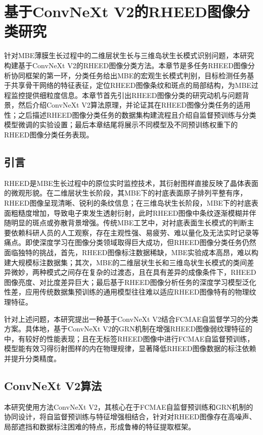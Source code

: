 \clearpage

\section{基于ConvNeXt V2的RHEED图像分类研究}

针对MBE薄膜生长过程中的二维层状生长与三维岛状生长模式识别问题，本研究构建基于ConvNeXt V2的RHEED图像分类方法。本章节是多任务RHEED图像分析协同框架的第一环，分类任务给出MBE的宏观生长模式判别，目标检测任务基于共享骨干网络的特征表征，定位RHEED图像条纹和斑点的局部结构，为MBE过程监控提供细粒度信息。本章节首先引出RHEED图像分类的研究动机与问题背景，然后介绍ConvNeXt V2算法原理，并论证其在RHEED图像分类任务的适用性；之后描述RHEED图像分类任务的数据集构建流程且介绍自监督预训练与分类模型微调的实验设置；最后本章结尾将展示不同模型及不同预训练权重下的RHEED图像分类任务表现。

\subsection{引言}
\label{subsec:cp2_intro}

RHEED是MBE生长过程中的原位实时监控技术，其衍射图样直接反映了晶体表面的微观形貌。在二维层状生长阶段，其MBE下的衬底表面原子排列平整有序，RHEED图像呈现清晰、锐利的条纹信息；在三维岛状生长阶段，MBE下的衬底表面粗糙度增加，导致电子束发生透射衍射，此时RHEED图像中条纹逐渐模糊并伴随明显的斑点或弥散背景增强。传统MBE工艺中，对衬底表面生长模式的判断主要依赖科研人员的人工观察，存在主观性强、易疲劳、难以量化及无法实时记录等痛点。即使深度学习在图像分类领域取得巨大成功，但RHEED图像分类任务仍然面临独特的挑战，首先，RHEED图像标注数据稀缺，MBE实验成本高昂，难以构建大规模标注数据集；其次，MBE的二维层状生长和三维岛状生长模式的类间差异微妙，两种模式之间存在复杂的过渡态，且在具有差异的成像条件下，RHEED图像亮度、对比度差异巨大；最后基于RHEED图像分析任务的深度学习模型泛化性差，应用传统数据集预训练的通用模型往往难以适应RHEED图像特有的物理纹理特征。

针对上述问题，本研究提出一种基于ConvNeXt V2结合FCMAE自监督学习的分类方案。具体地，基于ConvNeXt V2的GRN机制在增强RHEED图像弱纹理特征的中，有较好的性能表现；且在无标签RHEED图像中进行FCMAE自监督预训练，模型能有效习得衍射图样的内在物理规律，显著降低RHEED图像数据的标注依赖并提升分类精度。

\subsection{ConvNeXt V2算法}
\label{subsec:cp2_convnextv2}
本研究使用方法ConvNeXt V2，其核心在于FCMAE自监督预训练和GRN机制的协同设计，将自监督预训练与特征增强相结合，针对对RHEED图像存在高噪声、局部遮挡和数据标注困难的特点，形成鲁棒的特征提取框架。

